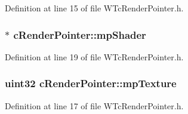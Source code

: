 Definition at line 15 of file WTcRenderPointer.h.

\hypertarget{classc_render_pointer_a52d59a73dafe36627f8e91fd7894ac4c}{
\subsubsection[{mpShader}]{$\ast$ {\bf cRenderPointer::mpShader}}}
\label{classc_render_pointer_a52d59a73dafe36627f8e91fd7894ac4c}


Definition at line 19 of file WTcRenderPointer.h.

\hypertarget{classc_render_pointer_a70c8e938776212e3d8a56c2ab5e87489}{
\subsubsection[{mpTexture}]{\setlength{\rightskip}{0pt plus 5cm}uint32 {\bf cRenderPointer::mpTexture}}}
\label{classc_render_pointer_a70c8e938776212e3d8a56c2ab5e87489}


Definition at line 17 of file WTcRenderPointer.h.

